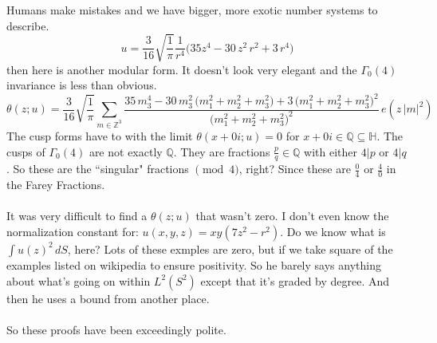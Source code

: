 \documentclass[12pt]{article}
\begin{document}
Humans make mistakes and we have bigger, more exotic number systems to describe.
$$ u = \frac{3}{16} \sqrt{\frac{1}{\pi}}  \frac{1}{r^4}\Big( 35z^4 - 30\, z^2 \, r^2 +3 \, r^4 \Big)$$
then here is another modular form.  It doesn't look very elegant and the $\Gamma_0(4)$ invariance is less than obvious.
$$ \theta(z;u) =  \frac{3}{16} \sqrt{\frac{1}{\pi}} \sum_{m \in \mathbb{Z}^3} \frac{35\,m_3^4 
- 30 \,m_3^2 \,\big(m_1^2 + m_2^2 + m_3^2\big) + 3 \,\big(m_1^2 + m_2^2 + m_3^2\big)^2 }{ \Big( m_1^2 + m_2^2 + m_3^2 \Big)^2} \, e(z\,|m|^2) $$
The cusp forms have to with the limit $\theta(x + 0i; u) = 0$ for $x + 0i\in \mathbb{Q}\subseteq \mathbb{H}$.  The cusps of $\Gamma_0(4)$ are not exactly $\mathbb{Q}$.  They are fractions $\frac{p}{q} \in \mathbb{Q}$ with either $4 | p $ or $4 | q$.   So these are the ``singular" fractions $\pmod 4$, right?  Since these are $\frac{0}{4}$ or $\frac{4}{0} $ in the Farey Fractions. \\ \\
It was very difficult to find a $\theta(z;u)$ that wasn't zero.  I don't even know the normalization constant for: $u(x,y,z) = xy (7z^2 - r^2) $.  Do we know what is $ \int u(z)^2 \, dS$, here?  Lots of these exmples are zero, but if we take square of the examples listed on wikipedia to ensure positivity.  So he barely says anything about what's going on within $L^2(S^2)$ except that it's graded by degree.  And then he uses a bound from another place. \\ \\
So these proofs have been exceedingly polite.
\end{document}
